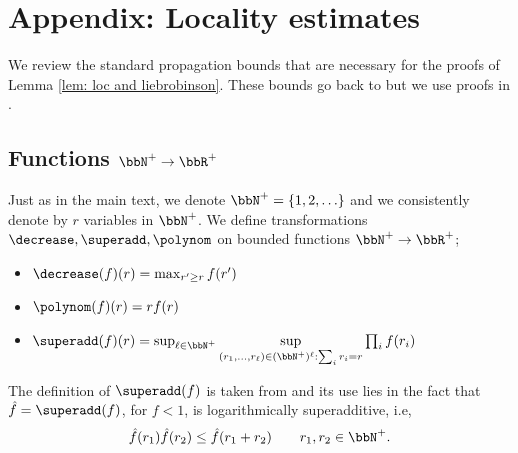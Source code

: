 \section{Appendix: Locality estimates}\label{app: locality}
We review the standard propagation bounds that are necessary for the proofs of Lemma \ref{lem: loc and liebrobinson}.  These bounds go back to 
\cite{Lieb:1972ts} but we use proofs in \cite{nachtergaele2019quasi}. 


\subsection{Functions \texorpdfstring{$\bbN^+\to \bbR^+$}{N+ to R+}}\label{subsec:F}
Just as in the main text, we denote $\bbN^{+}=\{1,2,\ldots\}$ and we consistently denote by $r$ variables in $\bbN^+$.
We define transformations $\decrease,\superadd, \polynom$ on bounded functions $\bbN^+\to\bbR^+$;
\begin{itemize}
	\item  $\decrease(f)(r)=\max_{r'\geq r} f(r')$
	\item $\polynom(f)(r)=r f(r) $
	\item  $\superadd(f)(r)= \sup_{\ell\in\bbN^+}\mathop{\sup}\limits_{(r_1,\ldots,r_\ell) \in (\bbN^+)^\ell: \sum_i r_i=r } \prod_{i} f(r_i)
	$
\end{itemize}
The definition of $\superadd(f)$ is taken from \cite{bruckner1960minimal} and its use lies in the fact that $\hat f=\superadd(f)$, for $f<1$,  is logarithmically {superadditive}, i.e,\, 
\begin{equation}\label{eq: log subadditive}
	\hat f(r_1)\hat f (r_2)\leq \hat f (r_1+r_2)\qquad r_1,r_2 \in \bbN^+.
\end{equation}

